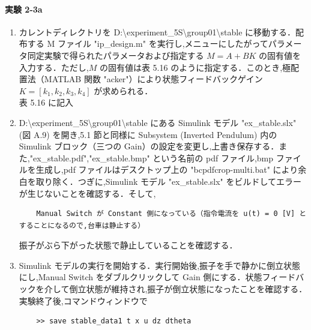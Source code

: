 \paragraph{実験 2-3a}
\begin{enumerate}
  \item カレントディレクトリを D:\textbackslash experiment\_5S\textbackslash group01\textbackslash stable に移動する．配布する M ファイル "ip\_design.m" を実行し,メニューにしたがってパラメータ同定実験で得られたパラメータおよび指定する \( M = A + BK \) の固有値を入力する．ただし,\( M \) の固有値は表 5.16 のように指定する．このとき,極配置法（MATLAB 関数 "acker"）により状態フィードバックゲイン \( K = [k_1, k_2, k_3, k_4] \) が求められる．\\
        表 5.16 に記入
        
  \item D:\textbackslash experiment\_5S\textbackslash group01\textbackslash stable にある Simulink モデル "ex\_stable.slx" (図 A.9) を開き,5.1 節と同様に Subsystem (Inverted Pendulum) 内の Simulink ブロック（三つの Gain）の設定を変更し,上書き保存する．また,"ex\_stable.pdf","ex\_stable.bmp" という名前の pdf ファイル,bmp ファイルを生成し,pdf ファイルはデスクトップ上の "bcpdfcrop-multi.bat" により余白を取り除く．つぎに,Simulink モデル "ex\_stable.slx" をビルドしてエラーが生じないことを確認する．そして,
        
        \begin{tcolorbox}[colback=gray!5!white,colframe=gray!75!black]
          \begin{lstlisting}
    Manual Switch が Constant 側になっている（指令電流を u(t) = 0 [V] とすることになるので,台車は静止する）
    \end{lstlisting}
        \end{tcolorbox}
        
        振子がぶら下がった状態で静止していることを確認する．
        
  \item Simulink モデルの実行を開始する．実行開始後,振子を手で静かに倒立状態にし,Manual Switch をダブルクリックして Gain 側にする．状態フィードバックを介して倒立状態が維持され,振子が倒立状態になったことを確認する．実験終了後,コマンドウィンドウで
        
        \begin{tcolorbox}[colback=gray!5!white,colframe=gray!75!black]
          \begin{lstlisting}
    >> save stable_data1 t x u dz dtheta
    \end{lstlisting}
        \end{tcolorbox}
        

\end{enumerate}
